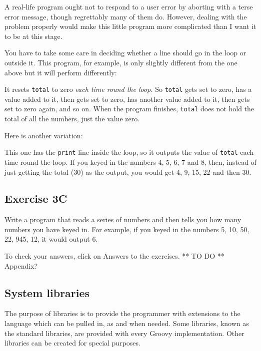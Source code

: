 A real-life program ought not to respond to a user error by aborting
with a terse error message, though regrettably many of them do.
However, dealing with the problem properly would make this little program
more complicated than I want it to be at this stage.

You have to take some care in deciding whether a line should go in the
loop or outside it.  This program, for example, is only slightly different
from the one above but it will perform differently:


It resets \texttt{total} to zero \emph{each time round the loop.}  So \texttt{total}
gets set to zero,
has a value added to it, then gets set to zero, has another value added to
it, then gets set to zero again, and so on.  When the program finishes,
\texttt{total} does not hold the total of all the numbers, just the value
zero.

Here is another variation:


This one has the \texttt{print} line inside the loop, so it outputs the value
of \texttt{total} each time round the loop.  If you keyed in the numbers
4, 5, 6, 7 and 8, then, instead of just getting the total (30) as the output,
you would get 4, 9, 15, 22 and then 30.

\subsection*{Exercise 3C}

Write a program that reads a series of numbers and then tells
you how many numbers you have keyed in.  For example, if you keyed in the
numbers 5, 10, 50, 22, 945, 12, it would output 6.

To check your answers, click on Answers to the exercises. ** TO DO ** Appendix?

\subsection{System libraries}

The purpose of libraries is to provide the programmer with extensions
to the language which can be pulled in, as and when needed. 
Some libraries, known as the standard libraries, are provided with every
Groovy implementation.  Other libraries can be created for special purposes.

